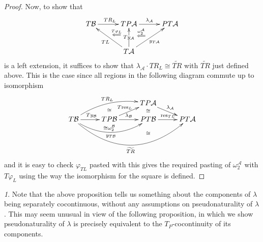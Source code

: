 \documentclass[a4paper,oneside,english]{amsart}
\numberwithin{equation}{section}
\numberwithin{figure}{section}
\theoremstyle{plain}
\theoremstyle{definition}
\theoremstyle{remark}
\newtheorem{rem}[thm]{\protect\remarkname}
\theoremstyle{definition}
\theoremstyle{plain}
\theoremstyle{plain}
\theoremstyle{plain}
\providecommand{\remarkname}{Remark}
\begin{document}
\begin{proof}
Now, to show that
\[
\xymatrix@=1em{T\mathcal{B}\ar[rr]^{TR_{L}} &  & TP\mathcal{A}\ar@{}[dl]|-{\stackrel{T\varphi_{L}}{\Longleftarrow}}\ar[rr]^{\lambda_{\mathcal{A}}}\ar@{}[rd]|-{\stackrel{\omega_{2}^{\mathcal{A}}}{\Longleftarrow}} &  & PT\mathcal{A}\\
 & \; &  & \;\\
 &  & T\mathcal{A}\ar[uull]^{TL}\ar[uu]|-{Ty_{\mathcal{A}}}\ar[uurr]_{y_{T\mathcal{A}}}
}
\]
is a left extension, it suffices to show that $\lambda_{\mathcal{A}}\cdot TR_{L}\cong\widetilde{TR}$
with $\widetilde{TR}$ just defined above. This is the case since
all regions in the following diagram commute up to isomorphism
\[
\xymatrix@=1em{ &  & \ar@{}[d]|-{\cong} &  & TP\mathcal{A}\ar[drr]^{\lambda_{\mathcal{A}}}\ar@{}[d]|-{\cong}\\
T\mathcal{B}\ar@/_{1.5pc}/[rrrr]_{y_{T\mathcal{B}}}\ar[rr]^{Ty_{\mathcal{B}}}\ar@/_{3pc}/[rrrrrr]_{\widetilde{TR}}\ar@/^{1pc}/[rrrru]^{TR_{L}} &  & TP\mathcal{B}\ar[rr]^{\lambda_{\mathcal{B}}}\ar[urr]^{T\textnormal{res}_{L}} &  & PT\mathcal{B}\ar[rr]^{\textnormal{res}_{TL}} &  & PT\mathcal{A}\\
 &  & \ar@{}[u]|-{\cong\omega_{2}^{\mathcal{B}}} &  & \ar@{}[]|-{\cong}
}
\]
and it is easy to check $\varphi_{TL}$ pasted with this gives the
required pasting of $\omega_{2}^{\mathcal{A}}$ with $T\varphi_{L}$
using the way the isomorphism for the square is defined.\end{proof}
\begin{rem}
Note that the above proposition tells us something about the components
of $\lambda$ being separately cocontinuous, without any assumptions
on pseudonaturality of $\lambda$. This may seem unusual in view of
the following proposition, in which we show pseudonaturality of $\lambda$
is precisely equivalent to the $T_{P}$-cocontinuity of its components.\end{rem}
\end{document}
